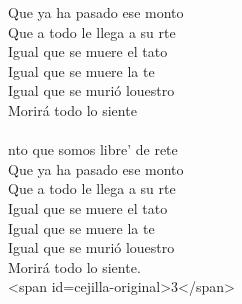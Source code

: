 \begin{cancion}
	Que ya ha pasado ese monto\\
	Que a todo le llega a su rte\\
	Igual que se muere el tato\\
	Igual que se muere la te\\
	Igual que se murió louestro\\
	Morirá todo lo siente\\
\jump\\
	nto que somos libre' de rete\\
	Que ya ha pasado ese monto\\
	Que a todo le llega a su rte\\
	Igual que se muere el tato\\
	Igual que se muere la te\\
	Igual que se murió louestro\\
	Morirá todo lo siente.\\
<span id=cejilla-original>3</span>\\
\end{cancion}%
